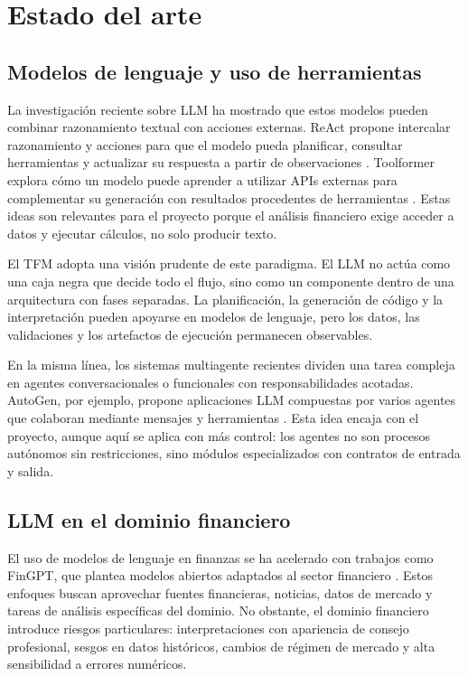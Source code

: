 \documentclass[11pt,a4paper]{article}
\let\oldsection\section
\renewcommand{\section}{\clearpage\oldsection}
\begin{document}
\section{Estado del arte}

\subsection{Modelos de lenguaje y uso de herramientas}

La investigaci\'on reciente sobre LLM ha mostrado que estos modelos pueden combinar razonamiento textual con acciones externas. ReAct propone intercalar razonamiento y acciones para que el modelo pueda planificar, consultar herramientas y actualizar su respuesta a partir de observaciones \cite{react}. Toolformer explora c\'omo un modelo puede aprender a utilizar APIs externas para complementar su generaci\'on con resultados procedentes de herramientas \cite{toolformer}. Estas ideas son relevantes para el proyecto porque el an\'alisis financiero exige acceder a datos y ejecutar c\'alculos, no solo producir texto.

El TFM adopta una visi\'on prudente de este paradigma. El LLM no act\'ua como una caja negra que decide todo el flujo, sino como un componente dentro de una arquitectura con fases separadas. La planificaci\'on, la generaci\'on de c\'odigo y la interpretaci\'on pueden apoyarse en modelos de lenguaje, pero los datos, las validaciones y los artefactos de ejecuci\'on permanecen observables.

En la misma l\'inea, los sistemas multiagente recientes dividen una tarea compleja en agentes conversacionales o funcionales con responsabilidades acotadas. AutoGen, por ejemplo, propone aplicaciones LLM compuestas por varios agentes que colaboran mediante mensajes y herramientas \cite{autogen}. Esta idea encaja con el proyecto, aunque aqu\'i se aplica con m\'as control: los agentes no son procesos aut\'onomos sin restricciones, sino m\'odulos especializados con contratos de entrada y salida.

\subsection{LLM en el dominio financiero}

El uso de modelos de lenguaje en finanzas se ha acelerado con trabajos como FinGPT, que plantea modelos abiertos adaptados al sector financiero \cite{fingpt}. Estos enfoques buscan aprovechar fuentes financieras, noticias, datos de mercado y tareas de an\'alisis espec\'ificas del dominio. No obstante, el dominio financiero introduce riesgos particulares: interpretaciones con apariencia de consejo profesional, sesgos en datos hist\'oricos, cambios de r\'egimen de mercado y alta sensibilidad a errores num\'ericos.
\end{document}
